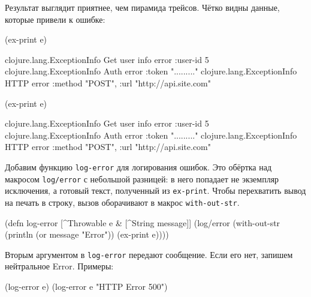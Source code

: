 \fi

Результат выглядит приятнее, чем пирамида трейсов. Чётко видны данные,
которые привели к ошибке:

\ifnarrow

\begin{english}
  \begin{clojure}
(ex-print e)

clojure.lang.ExceptionInfo
  Get user info error
  {:user-id 5}
clojure.lang.ExceptionInfo
  Auth error
  {:token "........."}
clojure.lang.ExceptionInfo
  HTTP error
  {:method "POST",
   :url "http://api.site.com"}
  \end{clojure}
\end{english}

\else

\begin{english}
  \begin{clojure}
(ex-print e)

clojure.lang.ExceptionInfo
  Get user info error
  {:user-id 5}
clojure.lang.ExceptionInfo
  Auth error
  {:token "........."}
clojure.lang.ExceptionInfo
  HTTP error
  {:method "POST", :url "http://api.site.com"}
  \end{clojure}
\end{english}

\fi


Добавим функцию \verb|log-error| для логирования ошибок. Это обёртка над
макросом \verb|log/error| с небольшой разницей: в него попадает не экземпляр
исключения, а готовый текст, полученный из \verb|ex-print|. Чтобы перехватить
вывод на печать в строку, вызов оборачивают в макрос \verb|with-out-str|.

\pagebreakafive

\begin{english}
  \begin{clojure}
(defn log-error
  [^Throwable e & [^String message]]
  (log/error
   (with-out-str
     (println (or message "Error"))
     (ex-print e))))
  \end{clojure}
\end{english}

Вторым аргументом в \verb|log-error| передают сообщение. Если его нет, запишем
нейтральное Error. Примеры:

\begin{english}
  \begin{clojure}
(log-error e)
(log-error e "HTTP Error 500")
  \end{clojure}
\end{english}

